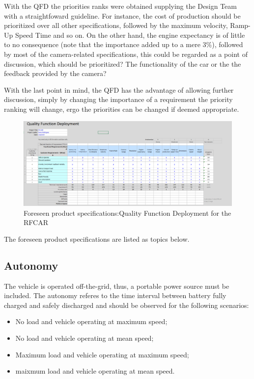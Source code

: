 With the QFD the priorities ranks were obtained supplying the Design Team with a
straightfoward guideline. For instance, the cost of production should be
prioritized over all other specifications, followed by the maximum velocity,
Ramp-Up Speed Time and so on.  On the other hand, the engine expectancy is of
little to no consequence (note that the importance added up to a mere 3\%),
followed by most of the camera-related specifications, this could be regarded as
a point of discussion, which should be prioritized? The functionality of the car
or the the feedback provided by the camera?

With the last point in mind, the QFD has the advantage of allowing further
discussion, simply by changing the importance of a requirement the priority ranking will change, ergo
the priorities can be changed if deemed appropriate.
%
\begin{figure}
\centering
\includegraphics[width=1.25\textwidth]{./sec/img/QFD_Initial.png}
\caption{\label{fig:QFD}Foreseen product specifications:Quality Function Deployment for the RFCAR}
\end{figure}
\newpage
The foreseen product specifications are listed as topics below.

\subsection{Autonomy}%
\label{sec:autonomy-specs}
The vehicle is operated off-the-grid, thus, a portable power source must be included. The autonomy referes to the time interval between battery fully charged and safely discharged and should be observed for the following scenarios:
\begin{itemize}
\item No load and vehicle operating at maximum speed;
\item No load and vehicle operating at mean speed;
\item Maximum load and vehicle operating at maximum speed;
\item maixmum load and vehicle operating at mean speed.
\end{itemize}
